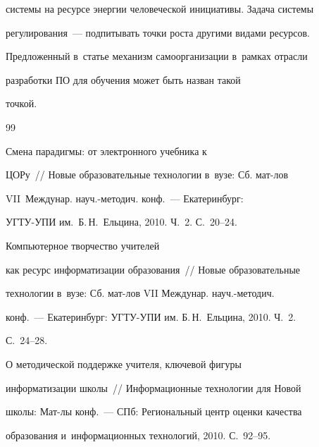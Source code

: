 системы на ресурсе энергии человеческой инициативы. Задача системы

регулирования~--- подпитывать точки роста другими видами ресурсов.

Предложенный в~статье механизм самоорганизации в~рамках отрасли

разработки ПО для обучения может быть назван такой

точкой.



  \vspace*{-4pt}



{\small\frenchspacing

{ %


\begin{thebibliography}{99}



  \vspace*{-2pt}




 Смена парадигмы: от электронного учебника к

ЦОРу~/\!\!/ Новые образовательные технологии в~вузе: Сб. мат-лов

VII~Междунар. на\-уч.-ме\-то\-ди\-ч. конф.~--- Екатеринбург:

УГТУ-УПИ им.\ Б.\,Н.~Ельцина, 2010.  Ч.~2. С.~20--24.


 Компьютерное творчество учителей

как ресурс информатизации образования~/\!\!/ Новые образовательные

технологии в~вузе: Сб. мат-лов VII Междунар. на\-уч.-ме\-то\-дич.

конф.~--- Екатеринбург: УГТУ-УПИ им. Б.\,Н.~Ельцина, 2010.  Ч.~2.

С.~24--28.


 О методической поддержке учителя, ключевой фигуры

информатизации школы~/\!\!/ Информационные технологии для Новой

школы: Мат-лы конф.~--- СПб: Региональный центр оценки качества

образования и~информационных технологий, 2010. С.~92--95.


\end{thebibliography}}}
